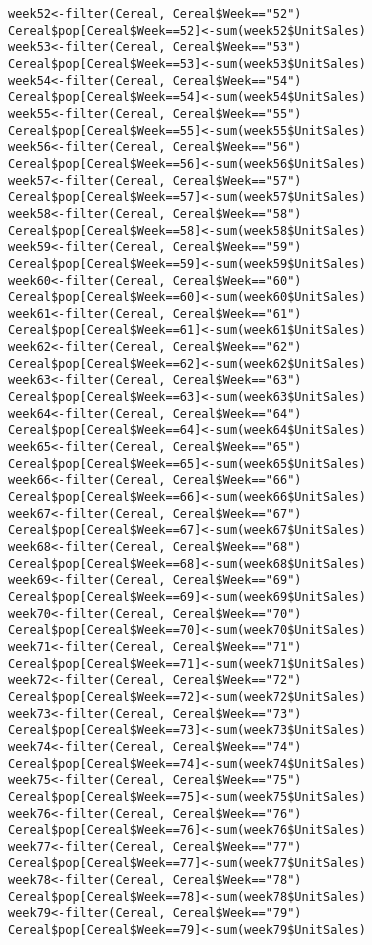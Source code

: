 \documentclass[12pt,english]{article}
\begin{document}
\begin{lstlisting}
week52<-filter(Cereal, Cereal$Week=="52")
Cereal$pop[Cereal$Week==52]<-sum(week52$UnitSales)
week53<-filter(Cereal, Cereal$Week=="53")
Cereal$pop[Cereal$Week==53]<-sum(week53$UnitSales)
week54<-filter(Cereal, Cereal$Week=="54")
Cereal$pop[Cereal$Week==54]<-sum(week54$UnitSales)
week55<-filter(Cereal, Cereal$Week=="55")
Cereal$pop[Cereal$Week==55]<-sum(week55$UnitSales)
week56<-filter(Cereal, Cereal$Week=="56")
Cereal$pop[Cereal$Week==56]<-sum(week56$UnitSales)
week57<-filter(Cereal, Cereal$Week=="57")
Cereal$pop[Cereal$Week==57]<-sum(week57$UnitSales)
week58<-filter(Cereal, Cereal$Week=="58")
Cereal$pop[Cereal$Week==58]<-sum(week58$UnitSales)
week59<-filter(Cereal, Cereal$Week=="59")
Cereal$pop[Cereal$Week==59]<-sum(week59$UnitSales)
week60<-filter(Cereal, Cereal$Week=="60")
Cereal$pop[Cereal$Week==60]<-sum(week60$UnitSales)
week61<-filter(Cereal, Cereal$Week=="61")
Cereal$pop[Cereal$Week==61]<-sum(week61$UnitSales)
week62<-filter(Cereal, Cereal$Week=="62")
Cereal$pop[Cereal$Week==62]<-sum(week62$UnitSales)
week63<-filter(Cereal, Cereal$Week=="63")
Cereal$pop[Cereal$Week==63]<-sum(week63$UnitSales)
week64<-filter(Cereal, Cereal$Week=="64")
Cereal$pop[Cereal$Week==64]<-sum(week64$UnitSales)
week65<-filter(Cereal, Cereal$Week=="65")
Cereal$pop[Cereal$Week==65]<-sum(week65$UnitSales)
week66<-filter(Cereal, Cereal$Week=="66")
Cereal$pop[Cereal$Week==66]<-sum(week66$UnitSales)
week67<-filter(Cereal, Cereal$Week=="67")
Cereal$pop[Cereal$Week==67]<-sum(week67$UnitSales)
week68<-filter(Cereal, Cereal$Week=="68")
Cereal$pop[Cereal$Week==68]<-sum(week68$UnitSales)
week69<-filter(Cereal, Cereal$Week=="69")
Cereal$pop[Cereal$Week==69]<-sum(week69$UnitSales)
week70<-filter(Cereal, Cereal$Week=="70")
Cereal$pop[Cereal$Week==70]<-sum(week70$UnitSales)
week71<-filter(Cereal, Cereal$Week=="71")
Cereal$pop[Cereal$Week==71]<-sum(week71$UnitSales)
week72<-filter(Cereal, Cereal$Week=="72")
Cereal$pop[Cereal$Week==72]<-sum(week72$UnitSales)
week73<-filter(Cereal, Cereal$Week=="73")
Cereal$pop[Cereal$Week==73]<-sum(week73$UnitSales)
week74<-filter(Cereal, Cereal$Week=="74")
Cereal$pop[Cereal$Week==74]<-sum(week74$UnitSales)
week75<-filter(Cereal, Cereal$Week=="75")
Cereal$pop[Cereal$Week==75]<-sum(week75$UnitSales)
week76<-filter(Cereal, Cereal$Week=="76")
Cereal$pop[Cereal$Week==76]<-sum(week76$UnitSales)
week77<-filter(Cereal, Cereal$Week=="77")
Cereal$pop[Cereal$Week==77]<-sum(week77$UnitSales)
week78<-filter(Cereal, Cereal$Week=="78")
Cereal$pop[Cereal$Week==78]<-sum(week78$UnitSales)
week79<-filter(Cereal, Cereal$Week=="79")
Cereal$pop[Cereal$Week==79]<-sum(week79$UnitSales)

\end{lstlisting}
\end{document}
